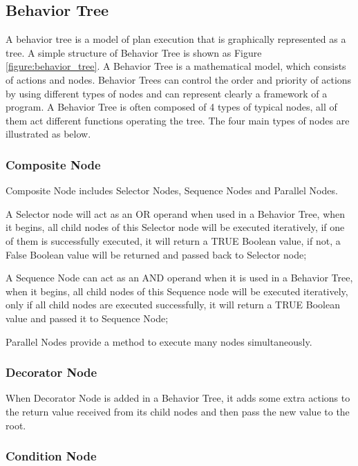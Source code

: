 \subsection{Behavior Tree}

A behavior tree is a model of plan execution that is graphically represented as a tree\cite{marcotte2017behavior}.
A simple structure of Behavior Tree is shown as Figure \ref{figure:behavior_tree}. A Behavior Tree is a mathematical model,
which consists of actions and nodes. Behavior Trees can control the order and priority of actions by using different
types of nodes and can represent clearly a framework of a program. A Behavior Tree is often composed of 4 types of
typical nodes, all of them act different functions operating the tree. The four main types of nodes are illustrated
as below.

\subsubsection*{Composite Node}

Composite Node includes Selector Nodes, Sequence Nodes and Parallel Nodes. 

A Selector node will act as an OR operand when used in a Behavior Tree, when it begins, all child nodes of this Selector
node will be executed iteratively, if one of them is successfully executed, it will return a TRUE Boolean value, if not,
a False Boolean value will be returned and passed back to Selector node;

A Sequence Node can act as an AND operand when it is used in a Behavior Tree, when it begins, all child nodes of this
Sequence node will be executed iteratively, only if all child nodes are executed successfully, it will return a TRUE Boolean
value and passed it to Sequence Node;

Parallel Nodes provide a method to execute many nodes simultaneously. 

\subsubsection*{Decorator Node}

When Decorator Node is added in a Behavior Tree, it adds some extra actions to the return value received from its child
nodes and then pass the new value to the root.

\subsubsection*{Condition Node}

